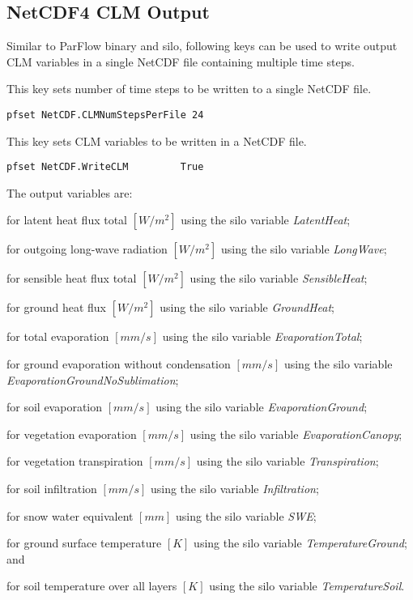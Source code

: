 \subsection{NetCDF4 CLM Output}
Similar to ParFlow binary and silo, following keys can be used to write output CLM variables in a single NetCDF file containing multiple time steps.

{This key sets number of time steps to be written to a single NetCDF file.}
\begin{display}\begin{verbatim}
pfset NetCDF.CLMNumStepsPerFile 24
\end{verbatim}\end{display}

{This key sets CLM variables to be written in a NetCDF file.}
\begin{display}\begin{verbatim}
pfset NetCDF.WriteCLM         True
\end{verbatim}\end{display}
The output variables are:
\begin{description}
\item {} for latent heat flux total $[W/m^2]$ using the silo variable {\em LatentHeat};
\item {} for outgoing long-wave radiation $[W/m^2]$ using the silo variable {\em LongWave};
\item {} for sensible heat flux total $[W/m^2]$ using the silo variable {\em SensibleHeat};
\item {} for ground heat flux $[W/m^2]$ using the silo variable {\em GroundHeat};
\item {} for total evaporation $[mm/s]$ using the silo variable {\em EvaporationTotal};
\item {} for ground evaporation without condensation $[mm/s]$ using the silo variable {\em EvaporationGroundNoSublimation};
\item {} for soil evaporation $[mm/s]$ using the silo variable {\em EvaporationGround};
\item {} for vegetation evaporation $[mm/s]$ using the silo variable {\em EvaporationCanopy};
\item {} for vegetation transpiration $[mm/s]$ using the silo variable {\em Transpiration};
\item {} for soil infiltration $[mm/s]$ using the silo variable {\em Infiltration};
\item {} for snow water equivalent $[mm]$ using the silo variable {\em SWE};
\item {} for ground surface temperature $[K]$ using the silo variable {\em TemperatureGround}; and
\item {} for soil temperature over all layers $[K]$ using the silo variable {\em TemperatureSoil}.
\end{description}

